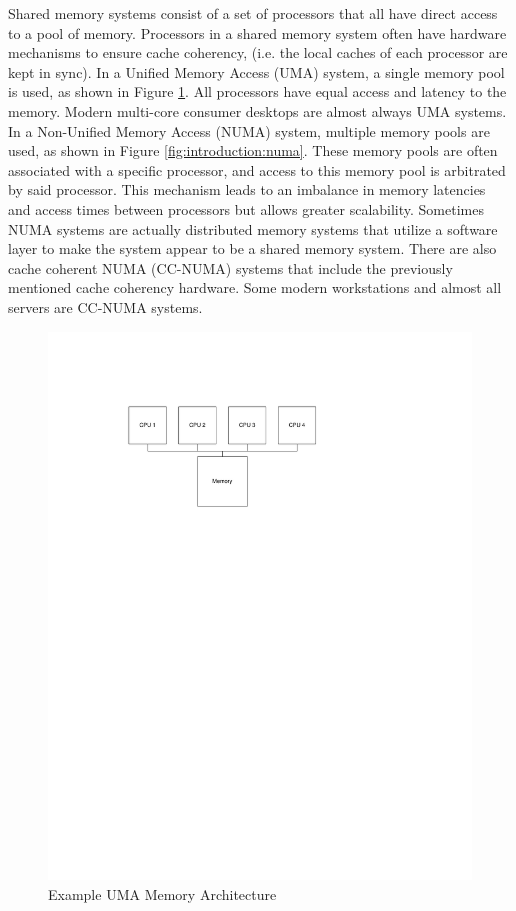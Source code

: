 Shared memory systems consist of a set of processors that all have direct access to a pool of memory. Processors in a shared memory system often have hardware mechanisms to ensure cache coherency, (i.e. the local caches of each processor are kept in sync). In a Unified Memory Access (UMA) system, a single memory pool is used, as shown in Figure \ref{fig:introduction:uma}. All processors have equal access and latency to the memory. Modern multi-core consumer desktops are almost always UMA systems. In a Non-Unified Memory Access (NUMA) system, multiple memory pools are used, as shown in Figure \ref{fig:introduction:numa}. These memory pools are often associated with a specific processor, and access to this memory pool is arbitrated by said processor. This mechanism leads to an imbalance in memory latencies and access times between processors but allows greater scalability. Sometimes NUMA systems are actually distributed memory systems that utilize a software layer to make the system appear to be a shared memory system. There are also cache coherent NUMA (CC-NUMA) systems that include the previously mentioned cache coherency hardware.  Some modern workstations and almost all servers are CC-NUMA systems.

\begin{figure}[ptb]
	\begin{centering}
		\includegraphics{Introduction/Figures/introduction-shared_memory_uma.pdf}
		\caption{Example UMA Memory Architecture}
		\label{fig:introduction:uma}
	\end{centering}
\end{figure}

